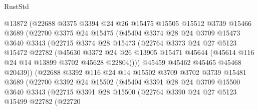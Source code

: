 \begin{lexlean}{RustStd}
\begin{coremodule}
                  @13872
                  (@22688
                    @3375
                    @3394
                    @24
                    @26
                    @15475
                    @15505
                    @15512
                    @3739
                    @15466
                    @3689
                    (@22700
                      @3375
                      @24
                      @15475
                      (@45404
                        @3374
                        @28
                        @24
                        @3709
                        @15473
                        @3640
                        @3343
                        (@22715
                          @3374
                          @28
                          @15473
                          (@22764
                            @3373
                            @24
                            @27
                            @5123
                            @15472
                            @22782
                            (@45630
                              @3372
                              @24
                              @26
                              @13905
                              @15471
                              @45644
                              (@45614 @116 @24 @14 @13899 @3702 @45628 @22804))))
                        @45459
                        @45462
                        @45465
                        @45468
                        @20439))
                    (@22688
                      @3392
                      @116
                      @24
                      @14
                      @15502
                      @3709
                      @3702
                      @3739
                      @15481
                      @3689
                      (@22700
                        @3392
                        @24
                        @15502
                        (@45404
                          @3391
                          @28
                          @24
                          @3709
                          @15500
                          @3640
                          @3343
                          (@22715
                            @3391
                            @28
                            @15500
                            (@22764
                              @3390
                              @24
                              @27
                              @5123
                              @15499
                              @22782
                              (@22720

\end{coremodule}
\end{lexlean}
